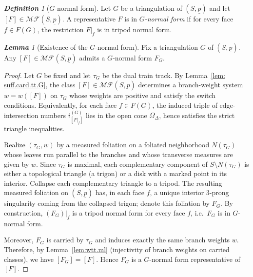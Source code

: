 \documentclass[11pt, letterpaper]{amsart}
\theoremstyle{definition}
\theoremstyle{remark}
\newtheorem{lemma}[theorem]{\rm\bf Lemma}
\newtheorem{definition}[theorem]{\rm\bf Definition}
\newcommand{\up}{\underline{p}}
\newcommand{\cMFp}{\mathcal{MF} (S,\up)}
\newcommand{\DEF}{} \newcommand{\WARN}{\textcolor{red}} \newcommand{\ALT}{\textcolor{brown}} \newcommand{\TODO}{\textcolor{teal}} %
\numberwithin{equation}{section}
\begin{document}
\begin{definition}[\(G\)-normal form]
\label{def:G.normal.form}
Let \(G\) be a triangulation of \((S,\underline p)\) and let \([F]\in \cMFp\).
A representative \(F\) is in \DEF{\em \(G\)-normal form} if for every face \(f\in F(G)\), the restriction \(F|_f\) is in tripod normal form.
\end{definition}

\begin{lemma}[Existence of the \(G\)-normal form]
\label{lem:G-normal-form-existence}
Fix a triangulation \(G\) of \((S,\underline p)\).
Any $[F] \in \cMFp$ admits a $G$-normal form $F_G$. 
\end{lemma}

\begin{proof}
Let \(G\) be fixed and let \(\tau_G\) be the dual train track.
By Lemma~\ref{lem: suff.card.tt.G}, the class \([F]\in\cMFp\) determines a branch-weight system
\(w=w([F])\) on \(\tau_G\) whose weights are positive and satisfy the switch conditions.
Equivalently, for each face \(f\in F(G)\), the induced triple of edge-intersection numbers
\(i^{(G)}_{[F|_f]}\) lies in the open cone \(\Omega_\Delta\), hence satisfies the strict triangle inequalities.

Realize \((\tau_G,w)\) by a measured foliation on a foliated neighborhood \(N(\tau_G)\)
whose leaves run parallel to the branches and whose transverse measures are given by \(w\).
Since \(\tau_G\) is maximal, each complementary component of \(S\setminus N(\tau_G)\)
is either a topological triangle (a trigon) or a disk with a marked point in its interior. Collapse each complementary triangle to a tripod.
The resulting measured foliation on \((S,\underline p)\) has, in each face \(f\),
a unique interior \(3\)-prong singularity coming from the collapsed trigon; denote this foliation by \(F_G\).
By construction, \((F_G)|_f\) is a tripod normal form for every face \(f\), i.e.\ \(F_G\) is in \(G\)-normal form.

Moreover, \(F_G\) is carried by \(\tau_G\) and induces exactly the same branch weights \(w\).
Therefore, by Lemma~\ref{lem:wtt.ml} (injectivity of branch weights on carried classes),
we have \([F_G]=[F]\). Hence \(F_G\) is a \(G\)-normal form representative of \([F]\).
\end{proof}
\end{document}
